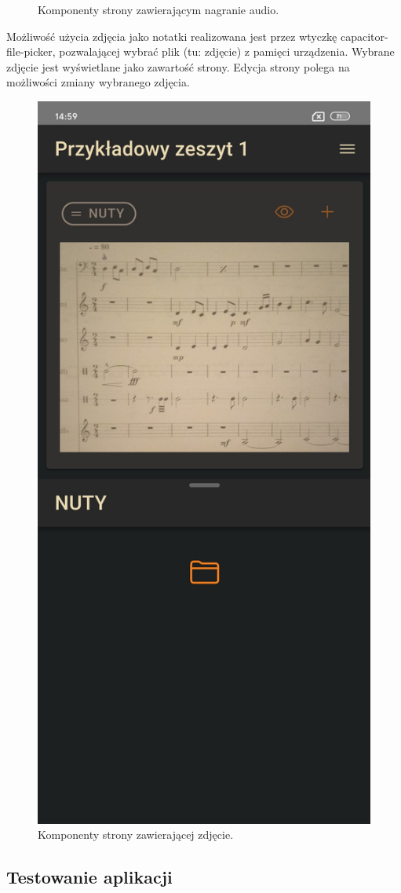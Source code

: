 \begin{figure}[H]
\begin{center}
	\end{center}
	\caption{Komponenty strony zawierającym nagranie audio.}
	\label{rys:audio-page}
\end{figure}

Możliwość użycia zdjęcia jako notatki realizowana jest przez wtyczkę capacitor-file-picker,
pozwalającej wybrać plik (tu: zdjęcie) z pamięci urządzenia. Wybrane zdjęcie jest wyświetlane jako zawartość strony.
Edycja strony polega na możliwości zmiany wybranego zdjęcia.
\begin{figure}[H]
	\begin{center}
		\includegraphics[scale=0.2]{media/PhotoPage.jpg}
	\end{center}
	\caption{Komponenty strony zawierającej zdjęcie.}
	\label{rys:photo-page}
\end{figure}

\subsection{Testowanie aplikacji}
